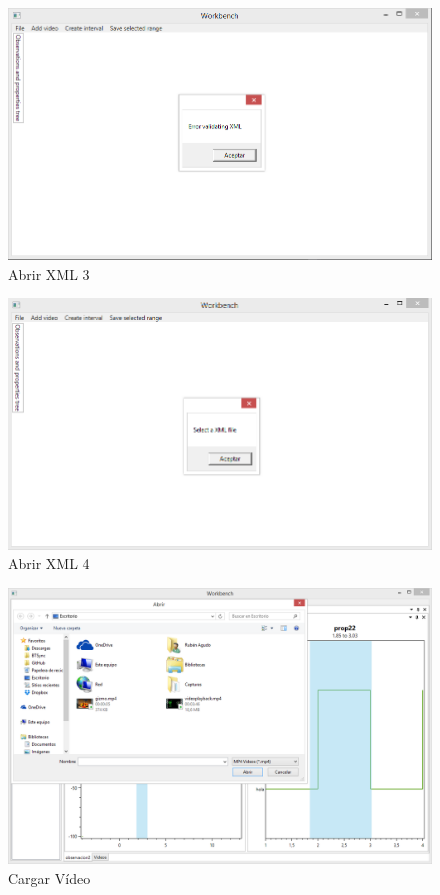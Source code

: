 \begin{figure}[h]
\centering
\includegraphics[width=0.9\linewidth]{./Figures/Capturas/AbrirXML3.PNG}
\caption{Abrir XML 3}
\label{fig:AbrirXML3}
\end{figure}

\begin{figure}[h]
\centering
\includegraphics[width=0.9\linewidth]{./Figures/Capturas/AbrirXML4.PNG}
\caption{Abrir XML 4}
\label{fig:AbrirXML4}
\end{figure}

\begin{figure}[h]
\centering
\includegraphics[width=0.9\linewidth]{./Figures/Capturas/CargarVideo.PNG}
\caption{Cargar V\'ideo}
\label{fig:CargarVideo}
\end{figure}

